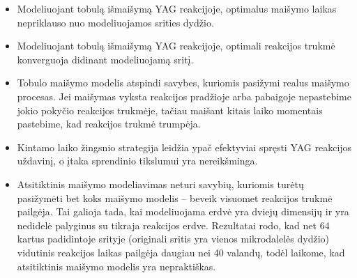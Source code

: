 \begin{itemize}
    
    \item Modeliuojant tobulą išmaišymą YAG reakcijoje, optimalus maišymo laikas nepriklauso nuo modeliuojamos srities dydžio.

    \item Modeliuojant tobulą išmaišymą YAG reakcijoje, optimali reakcijos trukmė konverguoja didinant modeliuojamą sritį.

    \item Tobulo maišymo modelis atspindi savybes, kuriomis pasižymi realus maišymo procesas. Jei maišymas vyksta reakcijos pradžioje arba pabaigoje nepastebime jokio pokyčio reakcijos trukmėje, tačiau maišant kitais laiko momentais pastebime, kad reakcijos trukmė trumpėja.

    \item Kintamo laiko žingsnio strategija leidžia ypač efektyviai spręsti YAG reakcijos uždavinį, o įtaka sprendinio tikslumui yra nereikšminga.

    \item Atsitiktinis maišymo modeliavimas neturi savybių, kuriomis turėtų pasižymėti bet koks maišymo modelis -- beveik visuomet reakcijos trukmė pailgėja. Tai galioja tada, kai modeliuojama erdvė yra dviejų dimensijų ir yra nedidelė palyginus su tikraja reakcijos erdve. Rezultatai rodo, kad net 64 kartus padidintoje srityje (originali sritis yra vienos mikrodalelės dydžio) vidutinis reakcijos laikas pailgėja daugiau nei 40 valandų, todėl laikome, kad atsitiktinis maišymo modelis yra nepraktiškas.

\end{itemize}
